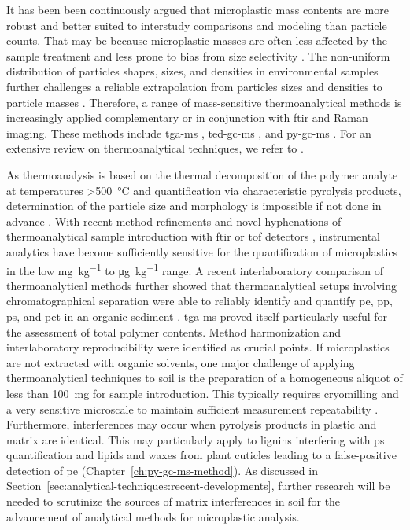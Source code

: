 It has been been continuously argued that microplastic mass contents are more robust and better suited to interstudy comparisons and modeling than particle counts. That may be because microplastic masses are often less affected by the sample treatment and less prone to bias from size selectivity \citep{SimonQuantification2018,BraunMicroplastics2018}. The non-uniform distribution of particles shapes, sizes, and densities in environmental samples further challenges a reliable extrapolation from particles sizes and densities to particle masses \citep{BraunMicroplastics2018}. Therefore, a range of mass-sensitive thermoanalytical methods is increasingly applied complementary or in conjunction with \ac{ftir} and Raman imaging. These methods include \ac{tga-ms} \citep[Chapter~\ref{ch:tga-ms-method};][]{BoyronAdvanced2019},
\ac{ted-gc-ms} \citep{DumichenFast2017}, and \ac{py-gc-ms} \citep{FischerSimultaneous2017,FischerMicroplastics2019}. For an extensive review on thermoanalytical techniques, we refer to \citet{LaNasaReview2020}.

As thermoanalysis is based on the thermal decomposition of the polymer analyte at temperatures \SI{>500}{\degreeCelsius} and quantification via characteristic pyrolysis products, determination of the particle size and morphology is impossible if not done in advance \citep{NguyenSeparation2019,DumichenFast2017}. With recent method refinements \citep[Chapter~\ref{ch:py-gc-ms-method};][]{DierkesQuantification2019} and novel hyphenations of thermoanalytical sample introduction with \ac{ftir} or \ac{tof}
detectors \citep{SullivanDetection2020}, instrumental analytics have become sufficiently sensitive for the quantification of microplastics in the low \si{\milli\gram\per\kilo\gram} to \si{\micro\gram\per\kilo\gram} range. A recent interlaboratory comparison of thermoanalytical methods further showed that thermoanalytical setups involving chromatographical separation were able to reliably identify and quantify \ac{pe}, \ac{pp}, \ac{ps}, and
\ac{pet} in an organic sediment \citep{BeckerQuantification2020}. \ac{tga-ms} proved itself particularly useful for the assessment of total polymer contents.
Method harmonization and interlaboratory reproducibility were identified as crucial points. If microplastics are not extracted with organic solvents, one major challenge of applying thermoanalytical techniques to soil is the preparation of a homogeneous aliquot of less than \SI{100}{\milli\gram} for sample introduction. This typically requires cryomilling and a very sensitive microscale to maintain sufficient measurement repeatability \citep[Chapter~\ref{ch:py-gc-ms-method};][]{DierkesQuantification2019}.
Furthermore, interferences may occur when pyrolysis products in plastic and matrix are identical. This may particularly apply to lignins interfering with \ac{ps} quantification \citep{FischerSimultaneous2017} and lipids and waxes from plant cuticles leading to a false-positive detection of \ac{pe} (Chapter~\ref{ch:py-gc-ms-method}). As discussed in Section~\ref{sec:analytical-techniques:recent-developments}, further research will be needed to scrutinize the sources of matrix interferences in soil for the advancement of analytical methods for microplastic analysis.

